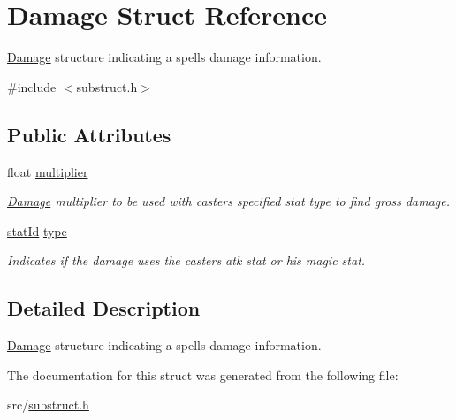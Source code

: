 \hypertarget{struct_damage}{}\section{Damage Struct Reference}
\label{struct_damage}


\hyperlink{struct_damage}{Damage} structure indicating a spell\textquotesingle{}s damage information.  




{\ttfamily \#include $<$substruct.\+h$>$}

\subsection*{Public Attributes}
\begin{DoxyCompactItemize}
\item 
\mbox{\label{struct_damage_ab44b7d05d54895150bb509597a1f643e}} 
float \hyperlink{struct_damage_ab44b7d05d54895150bb509597a1f643e}{multiplier}
\begin{DoxyCompactList}\small\item\em \hyperlink{struct_damage}{Damage} multiplier to be used with caster\textquotesingle{}s specified stat type to find gross damage. \end{DoxyCompactList}\item 
\mbox{\label{struct_damage_abbccd96aade52f68d8ff7db97939782a}} 
\hyperlink{substruct_8h_a90abc0a2e0eca99669a991794b8a9b46}{stat\+Id} \hyperlink{struct_damage_abbccd96aade52f68d8ff7db97939782a}{type}
\begin{DoxyCompactList}\small\item\em Indicates if the damage uses the caster\textquotesingle{}s atk stat or his magic stat. \end{DoxyCompactList}\end{DoxyCompactItemize}


\subsection{Detailed Description}
\hyperlink{struct_damage}{Damage} structure indicating a spell\textquotesingle{}s damage information. 

The documentation for this struct was generated from the following file\+:\begin{DoxyCompactItemize}
\item 
src/\hyperlink{substruct_8h}{substruct.\+h}\end{DoxyCompactItemize}
